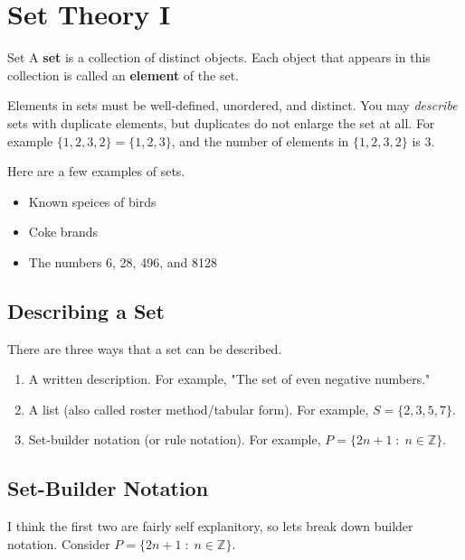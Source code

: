 \chapter{Set Theory I}

\begin{boxdefine}{Set}{}
	A {\bf set} is a collection of distinct objects. Each object that appears in this collection is called an {\bf element} of the set.
\end{boxdefine}

Elements in sets must be well-defined, unordered, and distinct. You may \emph{describe} sets with duplicate elements, but duplicates do not enlarge the set at all. For example $\{1,2,3,2\}=\{1,2,3\}$, and the number of elements in $\{1,2,3,2\}$ is 3.

\begin{boxexample}{}{}
	Here are a few examples of sets.

	\begin{itemize}
		\item Known speices of birds
		\item Coke brands
		\item The numbers 6, 28, 496, and 8128
	\end{itemize}
\end{boxexample}

\section{Describing a Set}

There are three ways that a set can be described.

\begin{enumerate}
	\item A written description. For example, "The set of even negative numbers."
	\item A list (also called roster method/tabular form). For example, $S = \{2,3,5,7\}$.
	\item Set-builder notation (or rule notation). For example, $P = \{2n+1\;:\;n \in \mathbb{Z}\}$.
\end{enumerate}

\section{Set-Builder Notation}

I think the first two are fairly self explanitory, so lets break down builder notation. Consider $P = \{2n+1\;:\;n \in \mathbb{Z}\}$.

